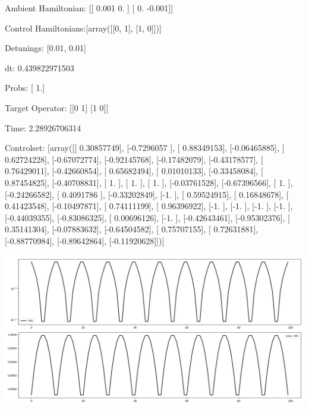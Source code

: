 \documentclass{article}
\begin{document}
    

\newpage

Ambient Hamiltonian: [[ 0.001  0.   ]
 [ 0.    -0.001]]

Control Hamiltonians:[array([[0, 1],
       [1, 0]])]

Detunings: [0.01, 0.01]

 dt: 0.439822971503

Probs: [ 1.]

Target Operator: [[0 1]
 [1 0]]

Time: 2.28926706314

Controlset: [array([[ 0.30857749],
       [-0.7296057 ],
       [ 0.88349153],
       [-0.06465885],
       [ 0.62724228],
       [-0.67072774],
       [-0.92145768],
       [-0.17482079],
       [-0.43178577],
       [ 0.76429011],
       [-0.42660854],
       [ 0.65682494],
       [ 0.01010133],
       [-0.33458084],
       [ 0.87454825],
       [-0.40708831],
       [ 1.        ],
       [ 1.        ],
       [ 1.        ],
       [-0.03761528],
       [-0.67396566],
       [ 1.        ],
       [-0.24266582],
       [ 0.4091786 ],
       [-0.33202849],
       [-1.        ],
       [ 0.59524915],
       [ 0.16848678],
       [ 0.41423548],
       [-0.10497871],
       [ 0.74111199],
       [ 0.96396922],
       [-1.        ],
       [-1.        ],
       [-1.        ],
       [-1.        ],
       [-0.44039355],
       [-0.83086325],
       [ 0.00696126],
       [-1.        ],
       [-0.42643461],
       [-0.95302376],
       [ 0.35141304],
       [-0.07883632],
       [-0.64504582],
       [ 0.75707155],
       [ 0.72631881],
       [-0.88770984],
       [-0.89642864],
       [-0.11920628]])]
\begin{center}
\includegraphics[scale=.9]{report_pickled_controls8/control_dpn_all}

\end{center}
\end{document}

